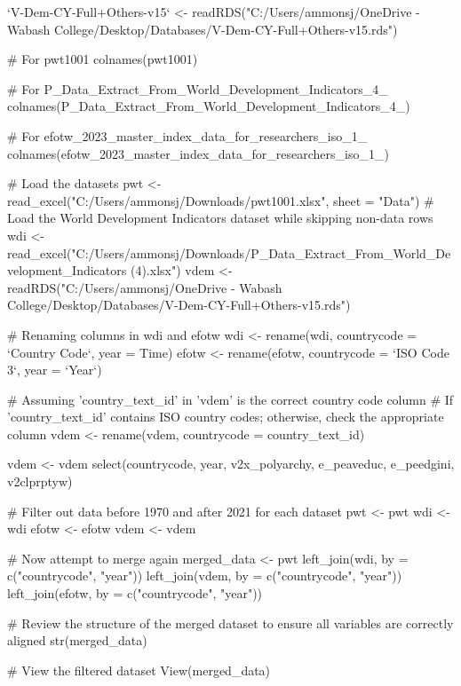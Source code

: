 {{`V-Dem-CY-Full+Others-v15` <- readRDS("C:/Users/ammonsj/OneDrive - Wabash College/Desktop/Databases/V-Dem-CY-Full+Others-v15.rds")

# For pwt1001
colnames(pwt1001)

# For P_Data_Extract_From_World_Development_Indicators_4_
colnames(P_Data_Extract_From_World_Development_Indicators_4_)

# For efotw_2023_master_index_data_for_researchers_iso_1_
colnames(efotw_2023_master_index_data_for_researchers_iso_1_)


# Load the datasets
pwt <- read_excel("C:/Users/ammonsj/Downloads/pwt1001.xlsx", sheet = "Data")
# Load the World Development Indicators dataset while skipping non-data rows
wdi <- read_excel("C:/Users/ammonsj/Downloads/P_Data_Extract_From_World_Development_Indicators (4).xlsx")
vdem <- readRDS("C:/Users/ammonsj/OneDrive - Wabash College/Desktop/Databases/V-Dem-CY-Full+Others-v15.rds")

# Renaming columns in wdi and efotw
wdi <- rename(wdi, countrycode = `Country Code`, year = Time)
efotw <- rename(efotw, countrycode = `ISO Code 3`, year = `Year`)

# Assuming 'country_text_id' in 'vdem' is the correct country code column
# If 'country_text_id' contains ISO country codes; otherwise, check the appropriate column
vdem <- rename(vdem, countrycode = country_text_id)

vdem <- vdem %
  select(countrycode, year, v2x_polyarchy, e_peaveduc, e_peedgini, v2clprptyw)

# Filter out data before 1970 and after 2021 for each dataset
pwt <- pwt %
wdi <- wdi %
efotw <- efotw %
vdem <- vdem %

# Now attempt to merge again
merged_data <- pwt %
  left_join(wdi, by = c("countrycode", "year")) %
  left_join(vdem, by = c("countrycode", "year")) %
  left_join(efotw, by = c("countrycode", "year"))


# Review the structure of the merged dataset to ensure all variables are correctly aligned
str(merged_data)

# View the filtered dataset
View(merged_data)

}}
